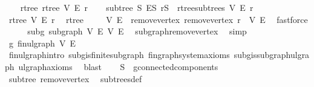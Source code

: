 \begin{isabellebody}
\ \ \isamarkupfalse%
\ rtree{\isacharcolon}{\kern0pt}\ {\isachardoublequoteopen}rtree\ V\ E\ r{\isachardoublequoteclose}\isanewline
\ \ \isamarkupfalse%
\ subtree{\isacharcolon}{\kern0pt}\ {\isachardoublequoteopen}{\isacharparenleft}{\kern0pt}S{\isacharcomma}{\kern0pt}\ E\isactrlsub S{\isacharcomma}{\kern0pt}\ r\isactrlsub S{\isacharparenright}{\kern0pt}\ {\isasymin}\ rtree{\isachardot}{\kern0pt}subtrees\ V\ E\ r{\isachardoublequoteclose}\isanewline
\ \ \isamarkupfalse%
\ rtree\ V\ E\ r\ \isamarkupfalse%
\ rtree\ \isacommand{{\isachardot}{\kern0pt}}\isamarkupfalse%
\isanewline
\ \ \isamarkupfalse%
\ V{\isacharprime}{\kern0pt}\ E{\isacharprime}{\kern0pt}\ \ remove{\isacharunderscore}{\kern0pt}vertex{\isacharcolon}{\kern0pt}\ {\isachardoublequoteopen}remove{\isacharunderscore}{\kern0pt}vertex\ r\ {\isacharequal}{\kern0pt}\ {\isacharparenleft}{\kern0pt}V{\isacharprime}{\kern0pt}{\isacharcomma}{\kern0pt}\ E{\isacharprime}{\kern0pt}{\isacharparenright}{\kern0pt}{\isachardoublequoteclose}\ \isamarkupfalse%
\ fastforce\isanewline
\ \ \isamarkupfalse%
\ \isamarkupfalse%
\ subg{\isacharcolon}{\kern0pt}\ subgraph\ V{\isacharprime}{\kern0pt}\ E{\isacharprime}{\kern0pt}\ V\ E\ \isamarkupfalse%
\ subgraph{\isacharunderscore}{\kern0pt}remove{\isacharunderscore}{\kern0pt}vertex\ \isamarkupfalse%
\ simp\isanewline
\ \ \isamarkupfalse%
\ g{\isacharprime}{\kern0pt}{\isacharcolon}{\kern0pt}\ fin{\isacharunderscore}{\kern0pt}ulgraph\ V{\isacharprime}{\kern0pt}\ E{\isacharprime}{\kern0pt}\ \isamarkupfalse%
\ fin{\isacharunderscore}{\kern0pt}ulgraph{\isachardot}{\kern0pt}intro\ subg{\isachardot}{\kern0pt}is{\isacharunderscore}{\kern0pt}finite{\isacharunderscore}{\kern0pt}subgraph\ fin{\isacharunderscore}{\kern0pt}graph{\isacharunderscore}{\kern0pt}system{\isacharunderscore}{\kern0pt}axioms\ subg{\isachardot}{\kern0pt}is{\isacharunderscore}{\kern0pt}subgraph{\isacharunderscore}{\kern0pt}ulgraph\ ulgraph{\isacharunderscore}{\kern0pt}axioms\ \isamarkupfalse%
\ blast\isanewline
\ \ \isamarkupfalse%
\ {\isachardoublequoteopen}S\ {\isasymin}\ g{\isacharprime}{\kern0pt}{\isachardot}{\kern0pt}connected{\isacharunderscore}{\kern0pt}components{\isachardoublequoteclose}\ \isamarkupfalse%
\ subtree\ remove{\isacharunderscore}{\kern0pt}vertex\ \isamarkupfalse%
\ subtrees{\isacharunderscore}{\kern0pt}def\ \isamarkupfalse%

\end{isabellebody}
